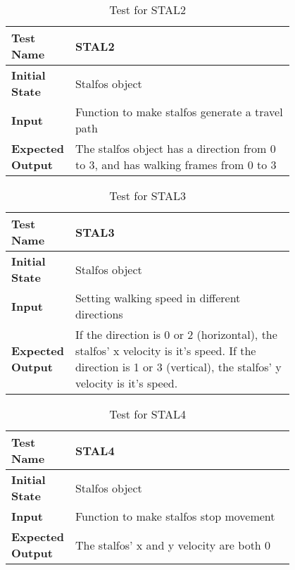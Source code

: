 \documentclass[12pt, titlepage]{article}
\begin{document}
\begin{table}[!htbp]
	
	\begin{tabular}[r]{|l|p{0.8\linewidth}|}
		
		\hline
		
		\textbf{Test Name} & STAL2 \\ 
		\hline
		\textbf{Initial State} & Stalfos object \\ 
		\hline
		\textbf{Input} & Function to make stalfos generate a travel path \\ 
		\hline 
		\textbf{Expected Output} & The stalfos object has a direction from 0 to 3, and has walking frames from 0 to 3  \\ 
		\hline
		
	\end{tabular}
	\caption{Test for STAL2}
	\label{Table}
\end{table}

\begin{table}[!htbp]
	
	\begin{tabular}[r]{|l|p{0.8\linewidth}|}
		
		\hline
		
		\textbf{Test Name} & STAL3 \\ 
		\hline
		\textbf{Initial State} & Stalfos object \\ 
		\hline
		\textbf{Input} & Setting walking speed in different directions \\ 
		\hline 
		\textbf{Expected Output} & If the direction is 0 or 2 (horizontal), the stalfos' x velocity is it's speed. If the direction is 
		1 or 3 (vertical), the stalfos' y velocity is it's speed.  \\ 
		\hline
		
	\end{tabular}
	\caption{Test for STAL3}
	\label{Table}
\end{table}

\begin{table}[!htbp]
	
	\begin{tabular}[r]{|l|p{0.8\linewidth}|}
		
		\hline
		
		\textbf{Test Name} & STAL4 \\ 
		\hline
		\textbf{Initial State} & Stalfos object \\ 
		\hline
		\textbf{Input} & Function to make stalfos stop movement \\ 
		\hline 
		\textbf{Expected Output} & The stalfos' x and y velocity are both 0  \\ 
		\hline
		
	\end{tabular}
	\caption{Test for STAL4}
	\label{Table}
\end{table}
\end{document}
